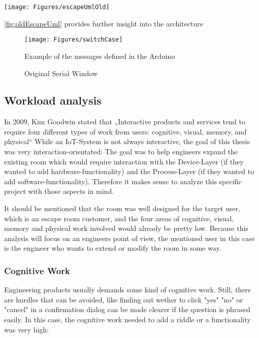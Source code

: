     \begin{sidewaysfigure}
        \centering
        \texttt{[image: Figures/escapeUmlOld]}
        \caption{The old escape room architecture}
        \label{fig:oldEscapeUml}
    \end{sidewaysfigure}

\ref{fig:oldEscapeUml} provides further insight into the architecture

\begin{figure}[th]
    \centering
    \texttt{[image: Figures/switchCase]}
    \decoRule
    \caption[messages]{Example of the messages defined in the Arduino}
    \label{fig:switchCase}
\end{figure}

\begin{figure}[th]
    \decoRule
    \caption[messages]{Original Serial Window}
    \label{fig:c++window}
\end{figure}

\subsection{Workload analysis}
In 2009, Kim Goodwin stated that 
„Interactive products and services tend to require four different types of work from users: 
cognitive, visual, memory, and physical“ \parencite{designDigitalAge} 
While an IoT-System is not always interactive, the goal of this thesis was very interaction-orientated: 
The goal was to help engineers expand the existing room which would require 
interaction with the Device-Layer (if they wanted to add hardware-functionality) 
and the Process-Layer (if they wanted to add software-functionality).
Therefore it makes sense to analyze this specific project with those aspects in mind. 

It should be mentioned that the room was well designed for the target user, which is an escape room customer, and 
the four areas of cognitive, visual, memory and physical work involved would already be pretty low.
Because this analysis will focus on an engineers point of view, the mentioned user in this case is the engineer who wants to extend or modify the room in some way.

\subsubsection{Cognitive Work}
Engineering products usually demands some kind of cognitive work. Still, there are hurdles that can be avoided,
like finding out wether to click "yes" "no" or "cancel" in a confirmation dialog can be made clearer if the question is phrased easily.
In this case, the cognitive work needed to add a riddle or a functionality was very high:

